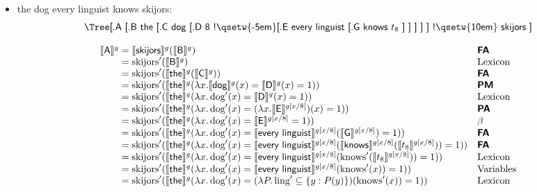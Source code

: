 \begin{itemize}
	\item \textsf{the dog every linguist knows skijors}:%
	\[\begin{array}{c}
		\begin{array}{c}
			\textsf{\Tree [.\textsf{A} [.\textsf{B} the [.\textsf{C} dog [.\textsf{D} 8 !\qsetw{-5em} [.\textsf{E} {every linguist} [.\textsf{G} knows $t_8$ ] ] ] ] ] !\qsetw{10em} skijors ]}%
		\end{array}
		\\\\
		\begin{array}{r@{}ll}
			\sv{\textsf{A}}^g &{}= \sv{\textsf{skijors}}^g(\sv{\textsf{B}}^g) & \bsf{FA}
			\\
			&{}= \text{skijors}'(\sv{\textsf{B}}^g) & \text{Lexicon}
			\\
			&{}= \text{skijors}'(\sv{\textsf{the}}^g(\sv{\textsf{C}}^g)) & \bsf{FA}
			\\
			&{}= \text{skijors}'(\sv{\textsf{the}}^g(\lambda x.\sv{\textsf{dog}}^g(x) = \sv{\textsf{D}}^g(x) = 1)) & \bsf{PM}%
			\\
			&{}= \text{skijors}'(\sv{\textsf{the}}^g(\lambda x.\,\text{dog}'(x) = \sv{\textsf{D}}^g(x) = 1)) & \text{Lexicon}%
			\\
			&{}= \text{skijors}'(\sv{\textsf{the}}^g(\lambda x.\,\text{dog}'(x) = (\lambda x.\sv{\textsf{E}}^{g[x/8]})(x) = 1)) & \bsf{PA}%
			\\
			&{}= \text{skijors}'(\sv{\textsf{the}}^g(\lambda x.\,\text{dog}'(x) = \sv{\textsf{E}}^{g[x/8]} = 1)) & \beta%
			\\
			&{}= \text{skijors}'(\sv{\textsf{the}}^g(\lambda x.\,\text{dog}'(x) = \sv{\textsf{every linguist}}^{g[x/8]}(\sv{\textsf{G}}^{g[x/8]}) = 1)) & \bsf{FA}%
			\\
			&{}= \text{skijors}'(\sv{\textsf{the}}^g(\lambda x.\,\text{dog}'(x) = \sv{\textsf{every linguist}}^{g[x/8]}(\sv{\textsf{knows}}^{g[x/8]}(\sv{t_8}^{g[x/8]})) = 1)) & \bsf{FA}%
			\\
			&{}= \text{skijors}'(\sv{\textsf{the}}^g(\lambda x.\,\text{dog}'(x) = \sv{\textsf{every linguist}}^{g[x/8]}(\text{knows}'(\sv{t_8}^{g[x/8]})) = 1)) & \text{Lexicon}%
			\\
			&{}= \text{skijors}'(\sv{\textsf{the}}^g(\lambda x.\,\text{dog}'(x) = \sv{\textsf{every linguist}}^{g[x/8]}(\text{knows}'(x)) = 1)) & \text{Variables}%
			\\
			&{}= \text{skijors}'(\sv{\textsf{the}}^g(\lambda x.\,\text{dog}'(x) = (\lambda P.\,\text{ling}' \subseteq \{y : P(y)\})(\text{knows}'(x)) = 1)) & \text{Lexicon}%

\end{array}
\end{array}\]
\end{itemize}
